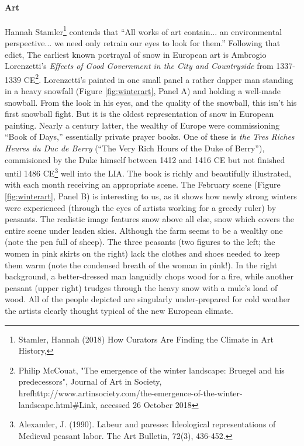 \documentclass[amstex,12pt]{book}
\begin{document}
\paragraph{Art}
Hannah Stamler\footnote{Stamler, Hannah (2018) How Curators Are Finding the Climate in Art History, } contends that ``All works of art contain... an environmental perspective... we need only retrain our eyes to look for them.'' Following that edict, The earliest known portrayal of snow in European art is Ambrogio Lorenzetti's \textit{Effects of Good Government in the City and Countryside} from 1337-1339 CE\footnote{Philip McCouat, "The emergence of the winter landscape: Bruegel and his predecessors", Journal of Art in Society, href{http://www.artinsociety.com/the-emergence-of-the-winter-landscape.html\#}{Link}, accessed 26 October 2018}. Lorenzetti's painted in one small panel a rather dapper man standing in a heavy snowfall (Figure \ref{fig:winterart}, Panel A) and holding a well-made snowball. From the look in his eyes, and the quality of the snowball, this isn't his first snowball fight. But it is the oldest representation of snow in European painting. Nearly a century latter, the wealthy of Europe were commissioning ``Book of Days,'' essentially private prayer books. One of these is \textit{the Tres Riches Heures du Duc de Berry} (``The Very Rich Hours of the Duke of Berry''), commisioned by the Duke himself between 1412 and 1416 CE but not finished until 1486 CE\footnote{Alexander, J. (1990). Labeur and paresse: Ideological representations of Medieval peasant labor. The Art Bulletin, 72(3), 436-452.} well into the LIA. The book is richly and beautifully illustrated, with each month receiving an appropriate scene. The February scene (Figure \ref{fig:winterart}, Panel B) is interesting to us, as it shows how newly strong winters were experienced (through the eyes of artists working for a greedy ruler) by peasants. The realistic image features snow above all else, snow which covers the entire scene under leaden skies. Although the farm seems to be a wealthy one (note the pen full of sheep). The three peasants (two figures to the left; the women in pink skirts on the right) lack the clothes and shoes needed to keep them warm (note the condensed breath of the woman in pink!). In the right background, a better-dressed man languidly chops wood for a fire, while another peasant (upper right) trudges through the heavy snow with a mule's load of wood. All of the people depicted are singularly under-prepared for cold weather the artists clearly thought typical of the new European climate.\\
\end{document}
